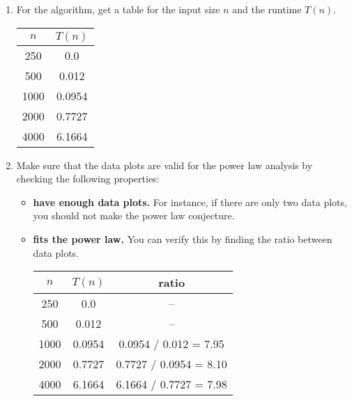\begin{enumerate}
  \item For the algorithm, get a table for the input size $n$ and the runtime $T(n)$.
    \begin{center}
      \begin{tabular}{ | c | c | } %
        \hline
        $n$ & $T(n)$ \\
        \hline
        250 & 0.0 \\
        500 & 0.012 \\
        1000 & 0.0954 \\
        2000 & 0.7727 \\
        4000 & 6.1664 \\
        \hline
      \end{tabular}
    \end{center}
  \item Make sure that the data plots are valid for the power law analysis by checking the following properties:
    \begin{itemize}
      \item \textbf{have enough data plots.} For instance, if there are only two data plots, you should not make the power law conjecture.
      \item \textbf{fits the power law.} You can verify this by finding the ratio between data plots.

        \begin{center}
          \begin{tabular}{ | c | c | c | }
            \hline
            $n$ & $T(n)$ & ratio \\
            \hline
            250 & 0.0 & -- \\
            500 & 0.012 & -- \\
            1000 & 0.0954 & 0.0954 / 0.012 = 7.95 \\
            2000 & 0.7727 & 0.7727 / 0.0954 = 8.10 \\
            4000 & 6.1664 & 6.1664 / 0.7727 = 7.98 \\
            \hline
          \end{tabular}
        \end{center}
    \end{itemize}


\end{enumerate}
